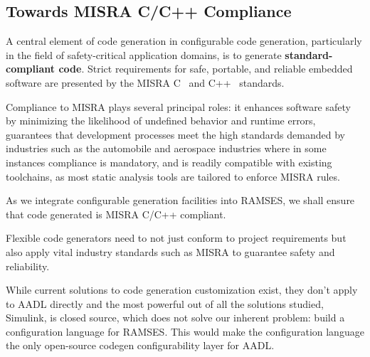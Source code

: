 \subsection*{Towards MISRA C/C++ Compliance}

A central element of code generation in configurable code generation, particularly in the field of safety-critical application domains, is to generate \textbf{standard-compliant code}. Strict requirements for safe, portable, and reliable embedded software are presented by the \gls{MISRA} C~\cite{Misra_C_2025} and C++~\cite{Misra_Cpp_2023} standards.
\par
Compliance to \gls{MISRA} plays several principal roles: it enhances software safety by minimizing the likelihood of undefined behavior and runtime errors, guarantees that development processes meet the high standards demanded by industries such as the automobile and aerospace industries where in some instances compliance is mandatory, and is readily compatible with existing toolchains, as most static analysis tools are tailored to enforce \gls{MISRA} rules.
\par
As we integrate configurable generation facilities into \gls{RAMSES}, we shall ensure that code generated is \gls{MISRA} C/C++ compliant.

\begin{tcolorbox}[colback=blue!5, colframe=blue!40!black] Flexible code generators need to not just conform to project requirements but also apply vital industry standards such as \gls{MISRA} to guarantee safety and reliability. \end{tcolorbox}


While current solutions to code generation customization exist, they don't apply to \gls{AADL} directly and the most powerful out of all the solutions studied, Simulink, is closed source, which does not solve our inherent problem: build a configuration language for \gls{RAMSES}. This would make the configuration language the only open-source codegen configurability layer for \gls{AADL}.





